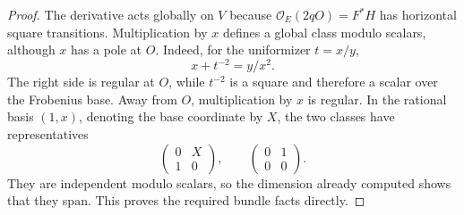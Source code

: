 \documentclass[11pt]{article}
\theoremstyle{definition}\newtheorem{definition}[theorem]{Definition}
\theoremstyle{remark}\newtheorem{remark}[theorem]{Remark}
\newcommand{\OO}{\mathcal O}
\begin{document}
\begin{proof}
The derivative acts globally on $V$ because $\OO_E(2qO)=F^*H$ has horizontal square transitions. Multiplication by $x$ defines a global class modulo scalars, although $x$ has a pole at $O$. Indeed, for the uniformizer $t=x/y$,
\begin{equation}\label{eq:at-infty}
                       x+t^{-2}=y/x^2.
\end{equation}
The right side is regular at $O$, while $t^{-2}$ is a square and therefore a scalar over the Frobenius base. Away from $O$, multiplication by $x$ is regular. In the rational basis $(1,x)$, denoting the base coordinate by $X$, the two classes have representatives
\begin{equation}\label{eq:ss-endmat}
 \begin{pmatrix}0&X\\1&0\end{pmatrix},\qquad
 \begin{pmatrix}0&1\\0&0\end{pmatrix}.
\end{equation}
They are independent modulo scalars, so the dimension already computed shows that they span. This proves the required bundle facts directly.
\end{proof}
\end{document}
